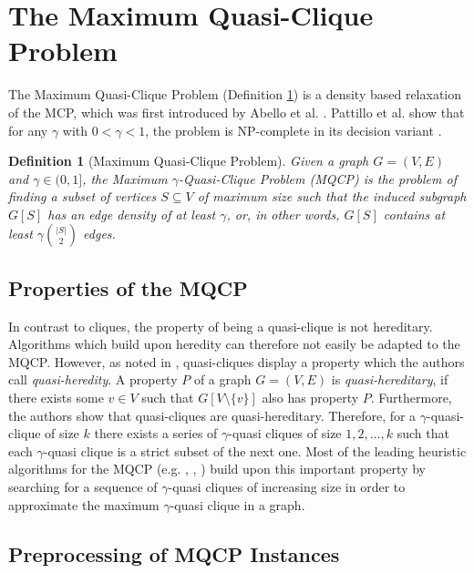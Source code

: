 \documentclass[draft,final]{vutinfth} %
\newtheorem{definition}{Definition}[section]
\begin{document}
\section{The Maximum Quasi-Clique Problem}\label{sec:mqcp}

The Maximum Quasi-Clique Problem (Definition \ref{def:mqcp}) is a density based relaxation of the MCP, which was first introduced by Abello et al. \cite{Abello2002}. Pattillo et al. show that for any $\gamma$ with $0 < \gamma < 1$, the problem is NP-complete in its decision variant \cite{pattillo_maximum_2013}. 

\begin{definition}[Maximum Quasi-Clique Problem]
	\label{def:mqcp}
	Given a graph $G = (V,E)$ and $\gamma \in (0,1]$, the Maximum $\gamma$-Quasi-Clique Problem (MQCP) is the problem of finding a subset of vertices $S \subseteq V$ of maximum size 
	such that the induced subgraph $G[S]$ has an edge density of at least $\gamma$, or, in other words, $G[S]$ contains at least $\gamma \binom{|S|}{2}$ edges. 
\end{definition}

\subsection{Properties of the MQCP}
In contrast to cliques, the property of being a quasi-clique is not hereditary. Algorithms which build upon heredity can therefore not easily be adapted to the MQCP. However, as noted in \cite{pattillo_maximum_2013}, quasi-cliques display a property which the authors call \textit{quasi-heredity}. A property $P$ of a graph $G = (V, E)$ is \textit{quasi-hereditary}, if there exists some $v \in V$ such that $G[V \setminus \{v\}]$ also has property $P$. Furthermore, the authors show that quasi-cliques are quasi-hereditary. Therefore, for a $\gamma$-quasi-clique of size $k$ there exists a series of $\gamma$-quasi cliques of size $1,2, \dots, k$ such that each $\gamma$-quasi clique is a strict subset of the next one. Most of the leading heuristic algorithms for the MQCP (e.g. \cite{djeddi_extension_2019}, \cite{zhou_opposition-based_2020}, \cite{chen_nuqclq_2021}) build upon this important property by searching for a sequence of $\gamma$-quasi cliques of increasing size in order to approximate the maximum $\gamma$-quasi clique in a graph. 

\subsection{Preprocessing of MQCP Instances}
\end{document}
